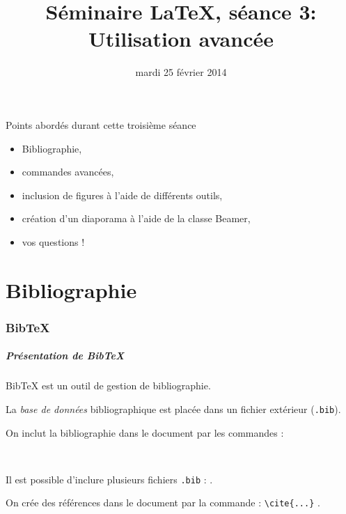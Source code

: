 \documentclass{beamer}
\title[Séminaire \LaTeX, séance 3]{Séminaire \LaTeX, séance 3: Utilisation avancée}
\date{mardi 25 février 2014}
\begin{document}

\begin{frame}
    \titlepage
\end{frame}


\begin{frame}{Points abordés durant cette troisième séance}
    \begin{itemize}
            \item Bibliographie, 
            \item commandes avancées, 
            \item inclusion de figures à l'aide de différents outils, 
            \item création d'un diaporama à l'aide de la classe Beamer, 
            \item vos questions !
        \end{itemize}
\end{frame}


\part{Bibliographie}


\section{BibTeX}


\begin{frame}[fragile]
\frametitle{Présentation de BibTeX}
BibTeX est un outil de gestion de bibliographie.

\medskip
La \emph{base de données} bibliographique est placée dans un fichier extérieur (\lstinline?.bib?).

\medskip
On inclut la bibliographie dans le document par les commandes :
\begin{lstlisting}


\end{lstlisting}
Il est possible d'inclure plusieurs fichiers \lstinline?.bib? :
\lstinline??.

\medskip
On crée des références dans le document par la commande : \lstinline?\cite{...}?  \cite{latexcompanion}.
\end{frame}
\end{document}
